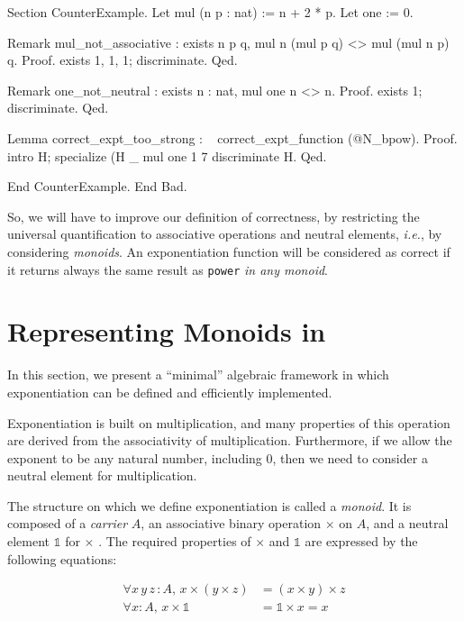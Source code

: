 \begin{Coqbad}
Section CounterExample.
    Let mul (n p : nat) := n + 2 * p.
    Let one := 0.

    Remark mul_not_associative :
      exists  n p q,  mul n (mul p q) <> mul (mul n p) q.
    Proof. 
        exists 1, 1, 1; discriminate. 
    Qed.

    Remark one_not_neutral  :
      exists n : nat, mul one n <> n.
    Proof.
      exists 1; discriminate.
    Qed.

    Lemma correct_expt_too_strong : 
          ~ correct_expt_function (@N_bpow).
    Proof.
      intro H; specialize (H _ mul one 1  7%
      discriminate H.    
    Qed.

End CounterExample.
End Bad.
 \end{Coqbad}


So, we will have to improve our definition of correctness, by restricting  the universal quantification to associative operations and neutral elements, \emph{i.e.}, by considering \emph{monoids}.
An exponentiation  function will be considered as correct if it returns always the same result as \texttt{power} \emph{in any monoid}.



\section{Representing Monoids in \coq \label{monoid-class-def}}

In this section, we present a ``minimal'' algebraic framework in which  exponentiation can be defined and efficiently implemented.

Exponentiation is built on multiplication, and many properties of 
this operation are derived from the associativity of multiplication. 
Furthermore, if we allow the exponent to be any natural number, including $0$, 
then we need to consider a neutral element for multiplication.

The structure on which we define exponentiation is called a \emph{monoid}.
It is composed of a \emph{carrier} $A$, an associative binary operation $\times$ on $A$, and a neutral element $\mathds{1}$ for $\times$ . The required properties of $\times$ and
$\mathds{1}$ are expressed by the following equations:


\begin{align}
  \label{eq}
  \forall x\,y\,z\,:A,\, x\times (y \times z) &= (x\times y) \times z
  \\
\forall x:A,\, x \times \mathds{1}  &= \mathds{1}  \times x = x
\end{align}


